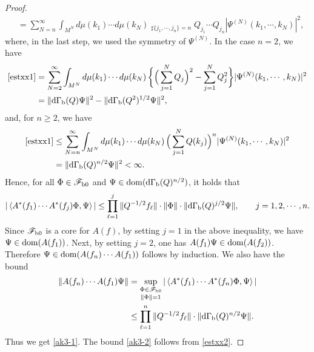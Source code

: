 \documentclass[12pt]{article}
\theoremstyle{plain}
\numberwithin{equation}{section}
\theoremstyle{remark}
\begin{document}
\begin{proof}
\begin{align}
&= \sum_{N=n}^\infty  \int_{M^N} d\mu(k_1)\cdots d\mu(k_N) \mathop{\sum_{j_1,\cdots,j_n=1}^N}_{\sharp \{j_1,\cdots,j_n\}=n} 
   Q_{j_1}\cdots Q_{j_n}| \Psi^{(N)}(k_1,\cdots,k_N)|^2,  \label{estxx1}
\end{align}
where, in the last step, we used the symmetry of $\Psi^{(N)}$.
In the case $n=2$, we have 
\begin{align}
\eqref{estxx1}
& = \sum_{N=2}^\infty \int_{M^N} d\mu(k_1)\cdots d\mu(k_N)\,\bigg\{ \Big( \sum_{j=1}^N Q_j \Big)^2 -\sum_{j=1}^N Q_j^2 \bigg\} 
    |\Psi^{(N)}(k_1,\cdots,k_N)|^2 \notag \\
& = \| \mathrm{d\Gamma_b}(Q)\Psi \|^2 - \| \mathrm{d\Gamma_b}(Q^2)^{1/2}\Psi \|^2,  \label{estxx2}
\end{align}
and, for $n\geq 2$, we have
\begin{align*}
\eqref{estxx1} 
& \leq  \sum_{N=n}^\infty  \int_{M^N} d\mu(k_1)\cdots d\mu(k_N)\,\Big( \sum_{j=1}^N Q(k_j)\Big)^n | \Psi^{(N)}(k_1,\cdots,k_N)|^2 \\
& = \| \mathrm{d\Gamma_b}(Q)^{n/2}\Psi \| ^2 < \infty.
\end{align*}
Hence, for all $\Phi\in\mathscr{F}_{\mathrm{b}0}$ and $\Psi\in\mathop{\mathrm{dom}}(\mathrm{d\Gamma_b}(Q)^{n/2})$, it holds that 
\begin{align*}
  |\left\langle A^*(f_1)\cdots A^*(f_j)\Phi,\Psi\right\rangle|
 \leq \prod_{\ell=1}^j \| Q^{-1/2}f_\ell \| \cdot \| \Phi \|\cdot \| \mathrm{d\Gamma_b}(Q)^{j/2}\Psi \|,\qquad j=1,2,\cdots,n.
\end{align*}
Since $\mathscr{F}_{\mathrm{b}0}$ is a core for $A(f)$, by setting $j=1$ in the above inequality, we have $\Psi\in\mathop{\mathrm{dom}}(A(f_1))$.
Next, by setting $j=2$, one has $A(f_1)\Psi \in\mathop{\mathrm{dom}}(A(f_2))$.
Therefore $\Psi\in \mathop{\mathrm{dom}}(A(f_n)\cdots A(f_1))$ follows by induction.
We also have the bound
\begin{align*}
 \| A(f_n)\cdots A(f_1)\Psi \| 
&= \mathop{\sup_{\Phi\in\mathscr{F}_{\mathrm{b}0}}}_\mathrm{\| \Phi \|=1}
  |\left\langle A^*(f_1)\cdots A^*(f_n)\Phi,\Psi\right\rangle| \\
& \leq \prod_{\ell=1}^n \| Q^{-1/2}f_\ell \| \cdot \| \mathrm{d\Gamma_b}(Q)^{n/2}\Psi \|.
\end{align*}
Thus we get \eqref{ak3-1}. The bound \eqref{ak3-2} follows from \eqref{estxx2}.
\end{proof}
\end{document}
